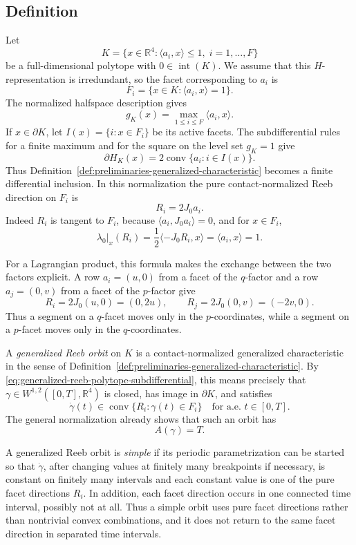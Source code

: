\subsection{Definition}\label{subsec:generalized-reeb-orbits-polytopes-definition}

Let
\[
  K=\{x\in\mathbb{R}^4:\langle a_i,x\rangle\leq 1,\; i=1,\ldots,F\}
\]
be a full-dimensional polytope with \(0\in\operatorname{int}(K)\). We assume
that this \(H\)-representation is irredundant, so the facet corresponding to
\(a_i\) is
\[
  F_i=\{x\in K:\langle a_i,x\rangle=1\}.
\]
The normalized halfspace description gives
\[
  g_K(x)=\max_{1\leq i\leq F}\langle a_i,x\rangle.
\]
If \(x\in\partial K\), let
\(I(x)=\{i:x\in F_i\}\) be its active facets.  The subdifferential rules for a
finite maximum and for the square on the level set \(g_K=1\) give
\begin{equation}\label{eq:generalized-reeb-polytope-subdifferential}
  \partial H_K(x)
  =2\operatorname{conv}\{a_i:i\in I(x)\}.
\end{equation}
Thus Definition~\ref{def:preliminaries-generalized-characteristic} becomes a
finite differential inclusion.  In this normalization the pure
contact-normalized Reeb direction on \(F_i\) is
\begin{equation}\label{eq:generalized-reeb-facet-vector}
  R_i=2J_0a_i.
\end{equation}
Indeed \(R_i\) is tangent to \(F_i\), because
\(\langle a_i,J_0a_i\rangle=0\), and for \(x\in F_i\),
\[
  \lambda_0|_x(R_i)
  =\frac{1}{2}\langle -J_0R_i,x\rangle
  =\langle a_i,x\rangle
  =1.
\]

For a Lagrangian product, this formula makes the exchange between the two
factors explicit.  A row \(a_i=(u,0)\) from a facet of the \(q\)-factor and a
row \(a_j=(0,v)\) from a facet of the \(p\)-factor give
\[
  R_i=2J_0(u,0)=(0,2u),
  \qquad
  R_j=2J_0(0,v)=(-2v,0).
\]
Thus a segment on a \(q\)-facet moves only in the \(p\)-coordinates, while a
segment on a \(p\)-facet moves only in the \(q\)-coordinates.

A \emph{generalized Reeb orbit} on \(K\) is a contact-normalized generalized
characteristic in the sense of
Definition~\ref{def:preliminaries-generalized-characteristic}.  By
\eqref{eq:generalized-reeb-polytope-subdifferential}, this means precisely that
\(\gamma\in W^{1,2}([0,T],\mathbb{R}^4)\) is closed, has image in
\(\partial K\), and satisfies
\begin{equation}\label{eq:generalized-reeb-inclusion}
  \dot{\gamma}(t)
  \in \operatorname{conv}\{R_i:\gamma(t)\in F_i\}
  \quad\text{for a.e. }t\in[0,T].
\end{equation}
The general normalization already shows that such an orbit has
\[
  A(\gamma)=T.
\]

A generalized Reeb orbit is \emph{simple} if its periodic parametrization can
be started so that \(\dot{\gamma}\), after changing values at finitely many
breakpoints if necessary, is constant on finitely many intervals and each
constant value is one of the pure facet directions \(R_i\). In addition, each
facet direction occurs in one connected time interval, possibly not at all.
Thus a simple orbit uses pure facet directions rather than nontrivial convex
combinations, and it does not return to the same facet direction in separated
time intervals.
